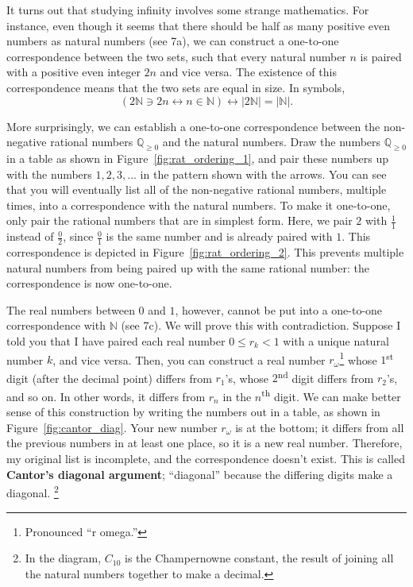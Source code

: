 \documentclass[../gatm.tex]{subfiles}
\begin{document}
It turns out that studying infinity involves some strange mathematics. For instance, even though it seems that there should be half as many positive even numbers as natural numbers (see 7a), we can construct a one-to-one correspondence between the two sets, such that every natural number $n$ is paired with a positive even integer $2n$ and vice versa. The existence of this correspondence means that the two sets are equal in size. In symbols, $$(2\mathbb{N} \ni 2n \leftrightarrow n \in \mathbb{N}) \leftrightarrow |2\mathbb{N}|=|\mathbb{N}|.$$ %

More surprisingly, we can establish a one-to-one correspondence between the non-negative rational numbers $\mathbb{Q}_{\geq 0}$ and the natural numbers. Draw the numbers $\mathbb{Q}_{\geq 0}$ in a table as shown in Figure~\ref{fig:rat_ordering_1}, and pair these numbers up with the numbers $1,2,3,...$ in the pattern shown with the arrows. You can see that you will eventually list all of the non-negative rational numbers, multiple times, into a correspondence with the natural numbers. To make it one-to-one, only pair the rational numbers that are in simplest form. Here, we pair $2$ with $\frac{1}{1}$ instead of $\frac{0}{2}$, since $\frac{0}{1}$ is the same number and is already paired with $1$. This correspondence is depicted in Figure~\ref{fig:rat_ordering_2}. This prevents multiple natural numbers from being paired up with the same rational number: the correspondence is now one-to-one.

The real numbers between $0$ and $1$, however, cannot be put into a one-to-one correspondence with $\mathbb{N}$ (see 7c). We will prove this with contradiction. Suppose I told you that I have paired each real number $0 \leq r_k < 1$ with a unique natural number $k$, and vice versa. Then, you can construct a real number $r_\omega$\footnote{Pronounced ``r omega.''} whose $1$\textsuperscript{st} digit (after the decimal point) differs from $r_1$’s, whose $2$\textsuperscript{nd} digit differs from $r_2$’s, and so on. In other words, it differs from $r_n$ in the $n$\textsuperscript{th} digit. We can make better sense of this construction by writing the numbers out in a table, as shown in Figure~\ref{fig:cantor_diag}. Your new number $r_\omega$ is at the bottom; it differs from all the previous numbers in at least one place, so it is a new real number. Therefore, my original list is incomplete, and the correspondence doesn’t exist. This is called \textbf{Cantor’s diagonal argument}; ``diagonal'' because the differing digits make a diagonal. \footnote{In the diagram, $C_{10}$ is the Champernowne constant, the result of joining all the natural numbers together to make a decimal.} %
\end{document}
